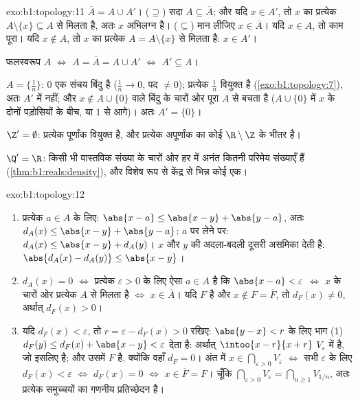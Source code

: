 \begin{solution}{exo:b1:topology:11}
$\overline A = A \cup A'$। ($\supseteq$) सदा $A \subseteq \overline A$; और
यदि $x \in A'$, तो $x$ का प्रत्येक  $A \setminus \{x\} \subseteq A$
से मिलता है, अतः $x$ अभिलग्न है। ($\subseteq$) मान लीजिए $x \in \overline
A$। यदि $x \in A$, तो काम पूरा। यदि $x \notin A$, तो $x$ का प्रत्येक
 $A = A \setminus \{x\}$ से मिलता है: $x \in A'$।

फलस्वरूप $A$  $\iff$ $A = \overline A = A \cup A'$ $\iff$ $A' \subseteq
A$।

$A = \{\frac 1n\}$: $0$ एक संचय बिंदु है ($\frac 1n \to 0$, पद $\neq 0$);
प्रत्येक $\frac 1n$ वियुक्त है (\cref{exo:b1:topology:7}), अतः $A'$ में
नहीं; और $x \notin A \cup \{0\}$ वाले बिंदु के चारों ओर पूरा  $A$ से
बचता है ($A \cup \{0\}$ में $x$ के दोनों पड़ोसियों के बीच, या $1$ से आगे)।
अतः $A' = \{0\}$।

$\Z' = \emptyset$: प्रत्येक पूर्णांक वियुक्त है, और प्रत्येक अपूर्णांक का
कोई  $\R \setminus \Z$ के भीतर है।

$\Q' = \R$: किसी भी वास्तविक संख्या के चारों ओर हर  में अनंत कितनी
परिमेय संख्याएँ हैं (\cref{thm:b1:reals:density}), और विशेष रूप से केंद्र से
भिन्न कोई एक।
\end{solution}

\begin{solution}{exo:b1:topology:12}
\begin{enumerate}
  \item प्रत्येक $a \in A$ के लिए: $\abs{x - a} \leq \abs{x - y} + \abs{y -
  a}$, अतः $d_A(x) \leq \abs{x - y} + \abs{y - a}$; $a$ पर  लेने पर:
  $d_A(x) \leq \abs{x - y} + d_A(y)$। $x$ और $y$ की अदला-बदली दूसरी असमिका
  देती है: $\abs{d_A(x) - d_A(y)} \leq \abs{x - y}$।
  \item $d_A(x) = 0$ $\iff$ प्रत्येक $\varepsilon > 0$ के लिए ऐसा $a \in A$
  है कि $\abs{x - a} < \varepsilon$ $\iff$ $x$ के चारों ओर प्रत्येक 
  $A$ से मिलता है $\iff$ $x \in \overline A$। यदि $F$  है और $x \notin
  F = \overline F$, तो $d_F(x) \neq 0$, अर्थात् $d_F(x) > 0$।
  \item यदि $d_F(x) < \varepsilon$, तो $r = \varepsilon - d_F(x) > 0$ रखिए:
  $\abs{y - x} < r$ के लिए भाग (1) $d_F(y) \leq d_F(x) + \abs{x - y} <
  \varepsilon$ देता है: अर्थात्  $\intoo{x - r}{x + r}$
  $V_\varepsilon$ में है, जो इसलिए  है; और उसमें $F$ है, क्योंकि वहाँ
  $d_F = 0$। अंत में $x \in \bigcap_{\varepsilon>0} V_\varepsilon$ $\iff$
  सभी $\varepsilon$ के लिए $d_F(x) < \varepsilon$ $\iff$ $d_F(x) = 0$ $\iff$
  $x \in \overline F = F$। चूँकि $\bigcap_{\varepsilon > 0} V_\varepsilon =
  \bigcap_{n \geq 1} V_{1/n}$, अतः प्रत्येक   समुच्चयों का
  गणनीय प्रतिच्छेदन है।
\end{enumerate}
\end{solution}

